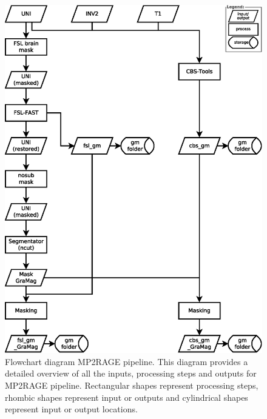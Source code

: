 \begin{figure}[htbp!]
\centering
\includegraphics[width=\textwidth]{figures/chapter_02_SI/figure_S6.eps}
\caption{Flowchart diagram MP2RAGE pipeline. This diagram provides a detailed overview of all the inputs, processing steps and outputs for MP2RAGE pipeline. Rectangular shapes represent processing steps, rhombic shapes represent input or outputs and cylindrical shapes represent input or output locations.}
\label{S10_Fig}
\end{figure}

